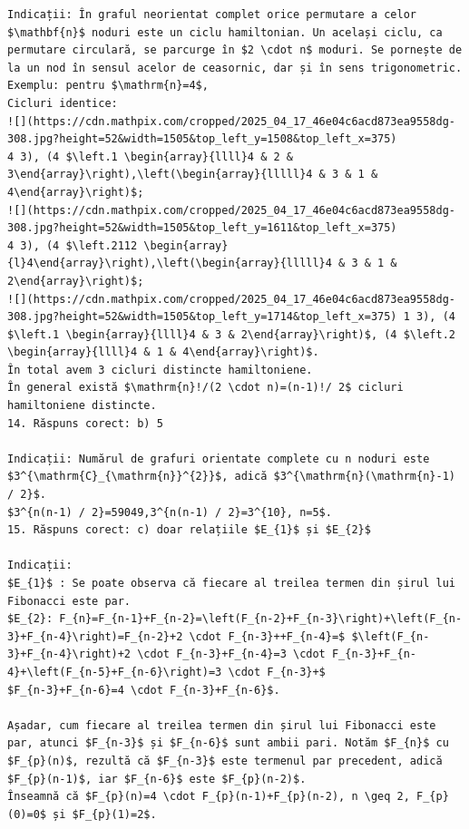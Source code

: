 \documentclass[10pt]{article}
\begin{document}
\begin{verbatim}
Indicații: În graful neorientat complet orice permutare a celor $\mathbf{n}$ noduri este un ciclu hamiltonian. Un același ciclu, ca permutare circulară, se parcurge în $2 \cdot n$ moduri. Se pornește de la un nod în sensul acelor de ceasornic, dar și în sens trigonometric.
Exemplu: pentru $\mathrm{n}=4$,
Cicluri identice:
![](https://cdn.mathpix.com/cropped/2025_04_17_46e04c6acd873ea9558dg-308.jpg?height=52&width=1505&top_left_y=1508&top_left_x=375)
4 3), (4 $\left.1 \begin{array}{llll}4 & 2 & 3\end{array}\right),\left(\begin{array}{lllll}4 & 3 & 1 & 4\end{array}\right)$;
![](https://cdn.mathpix.com/cropped/2025_04_17_46e04c6acd873ea9558dg-308.jpg?height=52&width=1505&top_left_y=1611&top_left_x=375)
4 3), (4 $\left.2112 \begin{array}{l}4\end{array}\right),\left(\begin{array}{lllll}4 & 3 & 1 & 2\end{array}\right)$;
![](https://cdn.mathpix.com/cropped/2025_04_17_46e04c6acd873ea9558dg-308.jpg?height=52&width=1505&top_left_y=1714&top_left_x=375) 1 3), (4 $\left.1 \begin{array}{llll}4 & 3 & 2\end{array}\right)$, (4 $\left.2 \begin{array}{llll}4 & 1 & 4\end{array}\right)$.
În total avem 3 cicluri distincte hamiltoniene.
În general există $\mathrm{n}!/(2 \cdot n)=(n-1)!/ 2$ cicluri hamiltoniene distincte.
14. Răspuns corect: b) 5

Indicații: Numărul de grafuri orientate complete cu n noduri este $3^{\mathrm{C}_{\mathrm{n}}^{2}}$, adică $3^{\mathrm{n}(\mathrm{n}-1) / 2}$.
$3^{n(n-1) / 2}=59049,3^{n(n-1) / 2}=3^{10}, n=5$.
15. Răspuns corect: c) doar relațiile $E_{1}$ și $E_{2}$

Indicații:
$E_{1}$ : Se poate observa că fiecare al treilea termen din șirul lui Fibonacci este par.
$E_{2}: F_{n}=F_{n-1}+F_{n-2}=\left(F_{n-2}+F_{n-3}\right)+\left(F_{n-3}+F_{n-4}\right)=F_{n-2}+2 \cdot F_{n-3}++F_{n-4}=$ $\left(F_{n-3}+F_{n-4}\right)+2 \cdot F_{n-3}+F_{n-4}=3 \cdot F_{n-3}+F_{n-4}+\left(F_{n-5}+F_{n-6}\right)=3 \cdot F_{n-3}+$
$F_{n-3}+F_{n-6}=4 \cdot F_{n-3}+F_{n-6}$.

Așadar, cum fiecare al treilea termen din șirul lui Fibonacci este par, atunci $F_{n-3}$ și $F_{n-6}$ sunt ambii pari. Notăm $F_{n}$ cu $F_{p}(n)$, rezultă că $F_{n-3}$ este termenul par precedent, adică $F_{p}(n-1)$, iar $F_{n-6}$ este $F_{p}(n-2)$.
Înseamnă că $F_{p}(n)=4 \cdot F_{p}(n-1)+F_{p}(n-2), n \geq 2, F_{p}(0)=0$ și $F_{p}(1)=2$.


\end{verbatim}
\end{document}
